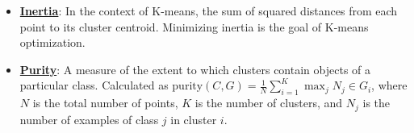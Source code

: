 \documentclass{article}%
\begin{document}
\begin{itemize}[leftmargin=*]
\item \href{https://purdue.brightspace.com/d2l/common/assets/pdfjs-d2l-dist/1.0.14-legacy/web/viewer.html?file=\%2Fcontent\%2Fenforced\%2F1095467-wl.202510.CS.24300.001\%2F12L2-distance-clusters.pdf\%3Fou\%3D1095467\&lang=en-us\&container=d2l-fileviewer-rendered-pdf\&fullscreen=d2l-fileviewer-rendered-pdf-dialog\&height=667#page=33}{\textbf{Inertia}}: In the context of K-means, the sum of squared distances from each point to its cluster centroid. Minimizing inertia is the goal of K-means optimization.%
\item \href{https://purdue.brightspace.com/d2l/common/assets/pdfjs-d2l-dist/1.0.14-legacy/web/viewer.html?file=\%2Fcontent\%2Fenforced\%2F1095467-wl.202510.CS.24300.001\%2F12L2-distance-clusters.pdf\%3Fou\%3D1095467\&lang=en-us\&container=d2l-fileviewer-rendered-pdf\&fullscreen=d2l-fileviewer-rendered-pdf-dialog\&height=667#page=44}{\textbf{Purity}}: A measure of the extent to which clusters contain objects of a particular class. Calculated as $\text{purity}(C, G) = \frac{1}{N} \sum_{i=1}^K \max_j N_j \in G_i$, where $N$ is the total number of points, $K$ is the number of clusters, and $N_j$ is the number of examples of class $j$ in cluster $i$.%
\end{itemize}%
\end{document}
